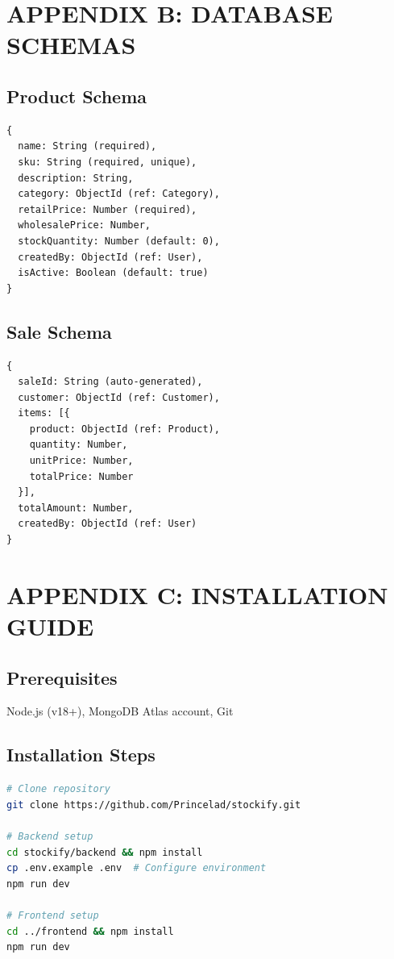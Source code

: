 \section*{APPENDIX B: DATABASE SCHEMAS}

\subsection*{Product Schema}
\begin{lstlisting}[caption=Product Schema]
{
  name: String (required),
  sku: String (required, unique),
  description: String,
  category: ObjectId (ref: Category),
  retailPrice: Number (required),
  wholesalePrice: Number,
  stockQuantity: Number (default: 0),
  createdBy: ObjectId (ref: User),
  isActive: Boolean (default: true)
}
\end{lstlisting}

\subsection*{Sale Schema}
\begin{lstlisting}[caption=Sale Schema]
{
  saleId: String (auto-generated),
  customer: ObjectId (ref: Customer),
  items: [{
    product: ObjectId (ref: Product),
    quantity: Number,
    unitPrice: Number,
    totalPrice: Number
  }],
  totalAmount: Number,
  createdBy: ObjectId (ref: User)
}
\end{lstlisting}

\section*{APPENDIX C: INSTALLATION GUIDE}

\subsection*{Prerequisites}
Node.js (v18+), MongoDB Atlas account, Git

\subsection*{Installation Steps}
\begin{lstlisting}[language=bash, caption=Installation Commands]
# Clone repository
git clone https://github.com/Princelad/stockify.git

# Backend setup
cd stockify/backend && npm install
cp .env.example .env  # Configure environment
npm run dev

# Frontend setup  
cd ../frontend && npm install
npm run dev
\end{lstlisting}

